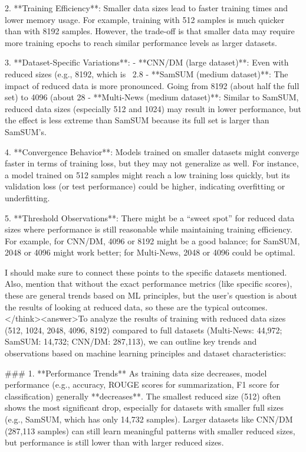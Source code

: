 2. **Training Efficiency**: Smaller data sizes lead to faster training times and lower memory usage. For example, training with 512 samples is much quicker than with 8192 samples. However, the trade-off is that smaller data may require more training epochs to reach similar performance levels as larger datasets.

3. **Dataset-Specific Variations**: 
   - **CNN/DM (large dataset)**: Even with reduced sizes (e.g., 8192, which is ~2.8%
   - **SamSUM (medium dataset)**: The impact of reduced data is more pronounced. Going from 8192 (about half the full set) to 4096 (about 28%
   - **Multi-News (medium dataset)**: Similar to SamSUM, reduced data sizes (especially 512 and 1024) may result in lower performance, but the effect is less extreme than SamSUM because its full set is larger than SamSUM’s.

4. **Convergence Behavior**: Models trained on smaller datasets might converge faster in terms of training loss, but they may not generalize as well. For instance, a model trained on 512 samples might reach a low training loss quickly, but its validation loss (or test performance) could be higher, indicating overfitting or underfitting.

5. **Threshold Observations**: There might be a “sweet spot” for reduced data sizes where performance is still reasonable while maintaining training efficiency. For example, for CNN/DM, 4096 or 8192 might be a good balance; for SamSUM, 2048 or 4096 might work better; for Multi-News, 2048 or 4096 could be optimal.

I should make sure to connect these points to the specific datasets mentioned. Also, mention that without the exact performance metrics (like specific scores), these are general trends based on ML principles, but the user’s question is about the results of looking at reduced data, so these are the typical outcomes.</think><answer>To analyze the results of training with reduced data sizes (512, 1024, 2048, 4096, 8192) compared to full datasets (Multi-News: 44,972; SamSUM: 14,732; CNN/DM: 287,113), we can outline key trends and observations based on machine learning principles and dataset characteristics:  


### 1. **Performance Trends**  
As training data size decreases, model performance (e.g., accuracy, ROUGE scores for summarization, F1 score for classification) generally **decreases**. The smallest reduced size (512) often shows the most significant drop, especially for datasets with smaller full sizes (e.g., SamSUM, which has only 14,732 samples). Larger datasets like CNN/DM (287,113 samples) can still learn meaningful patterns with smaller reduced sizes, but performance is still lower than with larger reduced sizes.  

